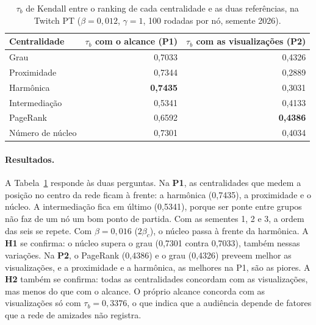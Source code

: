 \begin{table}[htbp]
\centering
\caption{$\tau_b$ de Kendall entre o ranking de cada centralidade e as duas referências, na Twitch
PT ($\beta = 0{,}012$, $\gamma = 1$, 100 rodadas por nó, semente 2026).}
\label{tab:concordancia}
\small
\begin{tabular}{@{}l r r@{}}
\toprule
Centralidade & $\tau_b$ com o alcance (P1) & $\tau_b$ com as visualizações (P2) \\
\midrule
Grau & 0,7033 & 0,4326 \\
Proximidade & 0,7344 & 0,2889 \\
Harmônica & \textbf{0,7435} & 0,3031 \\
Intermediação & 0,5341 & 0,4133 \\
PageRank & 0,6592 & \textbf{0,4386} \\
Número de núcleo & 0,7301 & 0,4034 \\
\bottomrule
\end{tabular}
\end{table}

\paragraph{Resultados.} A Tabela~\ref{tab:concordancia} responde às duas perguntas. Na \textbf{P1},
as centralidades que medem a posição no centro da rede ficam à frente: a harmônica (0,7435), a
proximidade e o núcleo. A intermediação fica em último (0,5341), porque ser ponte entre grupos não
faz de um nó um bom ponto de partida. Com as sementes 1, 2 e 3, a ordem das seis se repete. Com
$\beta = 0{,}016$ ($2\beta_c$), o núcleo passa à frente da harmônica. A \textbf{H1} se confirma: o
núcleo supera o grau (0,7301 contra 0,7033), também nessas variações. Na \textbf{P2}, o PageRank
(0,4386) e o grau (0,4326) preveem melhor as visualizações, e a proximidade e a harmônica, as
melhores na P1, são as piores. A \textbf{H2} também se confirma: todas as centralidades concordam
com as visualizações, mas menos do que com o alcance. O próprio alcance concorda com as
visualizações só com $\tau_b = 0{,}3376$, o que indica que a audiência depende de fatores que a rede
de amizades não registra.
